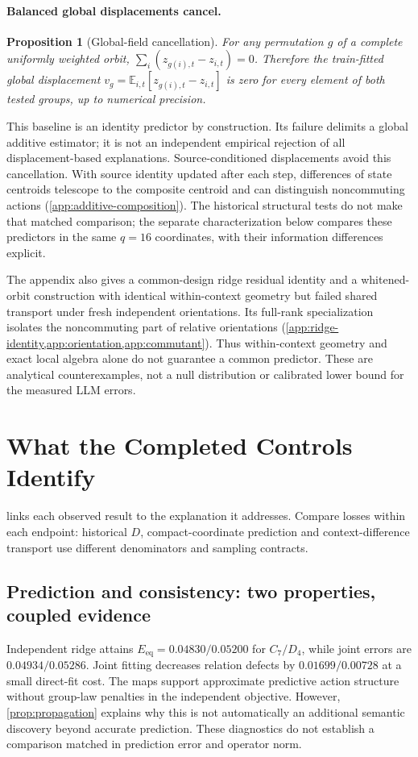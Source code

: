 \documentclass{article}
\newcommand{\Eeq}{E_{\mathrm{eq}}}
\newtheorem{proposition}{Proposition}
\begin{document}
\paragraph{Balanced global displacements cancel.}
\begin{proposition}[Global-field cancellation]
\label{prop:additive}
For any permutation $g$ of a complete uniformly weighted orbit, $\sum_i(z_{g(i),t}-z_{i,t})=0$. Therefore the train-fitted global displacement $v_g=\mathbb{E}_{i,t}[z_{g(i),t}-z_{i,t}]$ is zero for every element of both tested groups, up to numerical precision.
\end{proposition}
This baseline is an identity predictor by construction. Its failure delimits a global additive estimator; it is not an independent empirical rejection of all displacement-based explanations. Source-conditioned displacements avoid this cancellation. With source identity updated after each step, differences of state centroids telescope to the composite centroid and can distinguish noncommuting actions (\cref{app:additive-composition}). The historical structural tests do not make that matched comparison; the separate characterization below compares these predictors in the same $q=16$ coordinates, with their information differences explicit.

The appendix also gives a common-design ridge residual identity and a whitened-orbit construction with identical within-context geometry but failed shared transport under fresh independent orientations. Its full-rank specialization isolates the noncommuting part of relative orientations (\cref{app:ridge-identity,app:orientation,app:commutant}). Thus within-context geometry and exact local algebra alone do not guarantee a common predictor. These are analytical counterexamples, not a null distribution or calibrated lower bound for the measured LLM errors.

\section{What the Completed Controls Identify}
\label{sec:evidence}
 links each observed result to the explanation it addresses. Compare losses within each endpoint: historical $D$, compact-coordinate prediction and context-difference transport use different denominators and sampling contracts.

\subsection{Prediction and consistency: two properties, coupled evidence}
Independent ridge attains $\Eeq=0.04830/0.05200$ for $C_7/D_4$, while joint errors are $0.04934/0.05286$. Joint fitting decreases relation defects by $0.01699/0.00728$ at a small direct-fit cost. The maps support approximate predictive action structure without group-law penalties in the independent objective. However, \cref{prop:propagation} explains why this is not automatically an additional semantic discovery beyond accurate prediction. These diagnostics do not establish a comparison matched in prediction error and operator norm.
\end{document}
